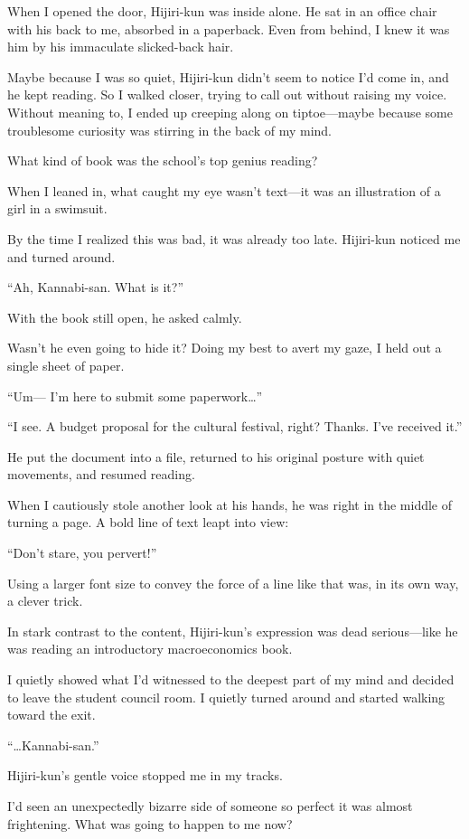 \documentclass[
    a4paper,
    12pt,
    twoside,
    openany,
    UTF8,
    fontset=windows
]{ctexbook}
\begin{document}
When I opened the door, Hijiri-kun was inside alone. He sat in an office chair with his back to me, absorbed in a paperback. Even from behind, I knew it was him by his immaculate slicked-back hair.

Maybe because I was so quiet, Hijiri-kun didn't seem to notice I'd come in, and he kept reading. So I walked closer, trying to call out without raising my voice. Without meaning to, I ended up creeping along on tiptoe---maybe because some troublesome curiosity was stirring in the back of my mind.

What kind of book was the school's top genius reading?

When I leaned in, what caught my eye wasn't text---it was an illustration of a girl in a swimsuit.

By the time I realized this was bad, it was already too late. Hijiri-kun noticed me and turned around.

``Ah, Kannabi-san. What is it?''

With the book still open, he asked calmly.

Wasn't he even going to hide it? Doing my best to avert my gaze, I held out a single sheet of paper.

``Um--- I'm here to submit some paperwork\dots''

``I see. A budget proposal for the cultural festival, right? Thanks. I've received it.''

He put the document into a file, returned to his original posture with quiet movements, and resumed reading.

When I cautiously stole another look at his hands, he was right in the middle of turning a page. A bold line of text leapt into view:

``Don't stare, you pervert!''

Using a larger font size to convey the force of a line like that was, in its own way, a clever trick.

In stark contrast to the content, Hijiri-kun's expression was dead serious---like he was reading an introductory macroeconomics book.

I quietly showed what I'd witnessed to the deepest part of my mind and decided to leave the student council room. I quietly turned around and started walking toward the exit.

``\dots Kannabi-san.''

Hijiri-kun's gentle voice stopped me in my tracks.

I'd seen an unexpectedly bizarre side of someone so perfect it was almost frightening. What was going to happen to me now?
\end{document}
